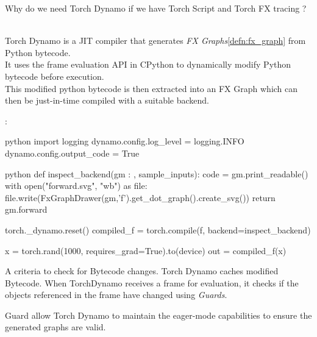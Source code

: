 \begin{sectionbox}\nospacing
    Why do we need Torch Dynamo if we have Torch Script  and
    Torch FX tracing ?\\

\end{sectionbox}
\begin{defnbox}\nospacing
    \begin{defn}\label{defn:torch_dynamo}\leavevmode\\
        Torch Dynamo is a JIT compiler that generates \textit{FX Graphs}\cref{defn:fx_graph} from Python bytecode.\\
        It uses the frame evaluation API in CPython to dynamically modify Python bytecode before execution.\\
        This modified python bytecode is then extracted into an FX Graph which can then be just-in-time compiled with a suitable backend.
        \begin{figure}[H]
            \vspace{-1em}
            \centering{
              \def\svgwidth{200pt}
              \resizebox{\linewidth}{!}{}
            }
        \end{figure}
        :
        \begin{mintlinebox}{python}
            import logging
            dynamo.config.log_level = logging.INFO
            dynamo.config.output_code = True
        \end{mintlinebox}
    \end{defn}
\end{defnbox}
\begin{mintlinebox}{python}
    def inspect_backend(gm : , sample_inputs):
        code = gm.print_readable()
        with open("forward.svg", "wb") as file:
            file.write(FxGraphDrawer(gm,'f').get_dot_graph().create_svg())
        return gm.forward

    torch._dynamo.reset()
    compiled_f = torch.compile(f, backend=inspect_backend)

    x = torch.rand(1000, requires_grad=True).to(device)
    out = compiled_f(x)
\end{mintlinebox}
\begin{defnbox}\nospacing
    \begin{defn}[Guards]\label{defn:guards}
        A criteria to check for Bytecode changes.
        Torch Dynamo caches modified Bytecode.
        When TorchDynamo receives a frame for evaluation, it checks if the objects referenced in the frame have changed using
        \textit{Guards}.
    \end{defn}
\end{defnbox}
\begin{notebox}[Note]\nospacing
      Guard allow Torch Dynamo to maintain the eager-mode capabilities to ensure the generated graphs are valid.
\end{notebox}

